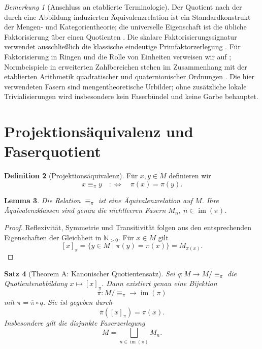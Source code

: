 \documentclass[11pt,a4paper,reqno]{amsart}
\newtheorem{theorem}{Satz}[section]
\newtheorem{lemma}[theorem]{Lemma}
\theoremstyle{definition}
\newtheorem{definition}[theorem]{Definition}
\theoremstyle{remark}
\newtheorem{remark}[theorem]{Bemerkung}
\newcommand{\Npos}{\mathbb{N}_{>0}}
\newcommand{\im}{\operatorname{im}}
\newcommand{\eqpi}{\mathrel{\equiv_{\pi}}}
\begin{document}
\begin{remark}[Anschluss an etablierte Terminologie]
Der Quotient nach der durch eine Abbildung induzierten Äquivalenzrelation ist ein Standardkonstrukt der Mengen- und Kategorientheorie; die universelle Eigenschaft ist die übliche Faktorisierung über einen Quotienten \cite{MacLane,Riehl}. Die skalare Faktorisierungssignatur verwendet ausschließlich die klassische eindeutige Primfaktorzerlegung \cite{IrelandRosen,NivenZuckermanMontgomery}. Für Faktorisierung in Ringen und die Rolle von Einheiten verweisen wir auf \cite{AtiyahMacdonald}; Normbeispiele in erweiterten Zahlbereichen stehen im Zusammenhang mit der etablierten Arithmetik quadratischer und quaternionischer Ordnungen \cite{ConwaySmith}. Die hier verwendeten Fasern sind mengentheoretische Urbilder; ohne zusätzliche lokale Trivialisierungen wird insbesondere kein Faserbündel und keine Garbe behauptet.
\end{remark}

\section{Projektionsäquivalenz und Faserquotient}

\begin{definition}[Projektionsäquivalenz]
Für $x,y\in M$ definieren wir
\[
  x\eqpi y
  \quad:\Longleftrightarrow\quad
  \pi(x)=\pi(y).
\]
\end{definition}

\begin{lemma}
Die Relation $\equiv_\pi$ ist eine Äquivalenzrelation auf $M$. Ihre Äquivalenzklassen sind genau die nichtleeren Fasern $M_n$, $n\in\im(\pi)$.
\end{lemma}

\begin{proof}
Reflexivität, Symmetrie und Transitivität folgen aus den entsprechenden Eigenschaften der Gleichheit in $\Npos$. Für $x\in M$ gilt
\[
  [x]_\pi=\{y\in M\mid \pi(y)=\pi(x)\}=M_{\pi(x)}.
\]
\end{proof}

\begin{theorem}[Theorem A: Kanonischer Quotientensatz]
\label{thm:quotient}
Sei $q\colon M\to M/{\equiv_\pi}$ die Quotientenabbildung $x\mapsto[x]_\pi$. Dann existiert genau eine Bijektion
\[
  \overline\pi\colon M/{\equiv_\pi}\longrightarrow\im(\pi)
\]
mit $\pi=\overline\pi\circ q$. Sie ist gegeben durch
\[
  \overline\pi([x]_\pi)=\pi(x).
\]
Insbesondere gilt die disjunkte Faserzerlegung
\[
  M=\bigsqcup_{n\in\im(\pi)}M_n.
\]
\end{theorem}
\end{document}
